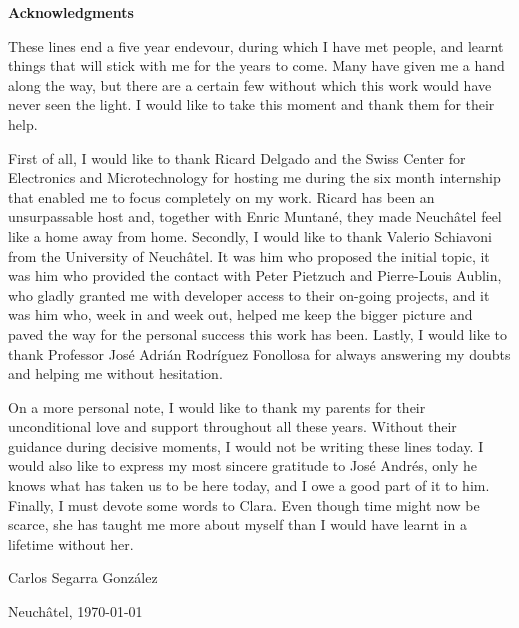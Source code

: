 \vspace*{2cm}
\Huge
\textbf{Acknowledgments} \label{sec:acknowledgments}
\normalsize

\vspace{1cm}

These lines end a five year endevour, during which I have met people, and learnt things that will stick with me for the years to come.
Many have given me a hand along the way, but there are a certain few without which this work would have never seen the light.
I would like to take this moment and thank them for their help.

First of all, I would like to thank Ricard Delgado and the Swiss Center for Electronics and Microtechnology for hosting me during the six month internship that enabled me to focus completely on my work.
Ricard has been an unsurpassable host and, together with Enric Muntan\'e, they made Neuch\^atel feel like a home away from home.
Secondly, I would like to thank Valerio Schiavoni from the University of Neuch\^atel.
It was him who proposed the initial topic, it was him who provided the contact with Peter Pietzuch and Pierre-Louis Aublin, who gladly granted me with developer access to their on-going projects, and it was him who, week in and week out, helped me keep the bigger picture and paved the way for the personal success this work has been.
Lastly, I would like to thank Professor Jos\'e Adri\'an Rodr\'iguez Fonollosa for always answering my doubts and helping me without hesitation.

On a more personal note, I would like to thank my parents for their unconditional love and support throughout all these years.
Without their guidance during decisive moments, I would not be writing these lines today.
I would also like to express my most sincere gratitude to Jos\'e Andr\'es, only he knows what has taken us to be here today, and I owe a good part of it to him.
Finally, I must devote some words to Clara.
Even though time might now be scarce, she has taught me more about myself than I would have learnt in a lifetime without her.

\vspace{1cm}

\begin{flushright}
Carlos Segarra Gonz\'alez

Neuch\^atel, \today
\end{flushright}

\vspace*{\fill}
